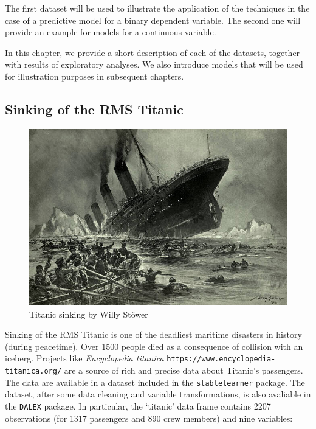 \documentclass[12pt,]{krantz}
\begin{document}
The first dataset will be used to illustrate the application of the techniques in the case of a predictive model for a binary dependent variable. The second one will provide an example for models for a continuous variable.

In this chapter, we provide a short description of each of the datasets, together with results of exploratory analyses. We also introduce models that will be used for illustration purposes in subsequent chapters.

\hypertarget{TitanicDataset}{%
\subsection{Sinking of the RMS Titanic}\label{TitanicDataset}}

\begin{figure}
\centering
\includegraphics{figure/Titanic.jpg}
\caption{Titanic sinking by Willy Stöwer}
\end{figure}

Sinking of the RMS Titanic is one of the deadliest maritime disasters in history (during peacetime). Over 1500 people died as a consequence of collision with an iceberg. Projects like \emph{Encyclopedia titanica} \texttt{https://www.encyclopedia-titanica.org/} are a source of rich and precise data about Titanic's passengers. The data are available in a dataset included in the \texttt{stablelearner} package. The dataset, after some data cleaning and variable transformations, is also avaliable in the \texttt{DALEX} package. In particular, the `titanic' data frame contains 2207 observations (for 1317 passengers and 890 crew members) and nine variables:
\end{document}
